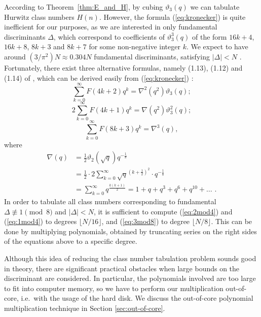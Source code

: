 \documentclass{mcom-l}
\theoremstyle{definition}
\begin{document}
According to Theorem~\ref{thm:E_and_H}, by cubing $\vartheta_3(q)$ we
can tabulate Hurwitz class numbers $H(n)$. However, the formula
(\ref{eq:kronecker}) is quite inefficient for our purposes, as we are
interested in only fundamental discriminants $\Delta$, which
correspond to coefficients of $\vartheta_3^3(q)$ of the form $16k +
4$, $16k + 8$, $8k + 3$ and $8k + 7$ for some non-negative integer
$k$.  We expect to have around $(3/\pi^2)N \approx 0.304 N$
fundamental discriminants, satisfying $|\Delta| < N$ \cite[Section
  5.10]{cohen3}. Fortunately, there exist three alternative formulas,
namely (1.13), (1.12) and (1.14) of \cite{watson}, which can be
derived easily from (\ref{eq:kronecker}) \cite{bell}:
\begin{equation}  \label{eq:2mod4}
\sum_{k = 0}^\infty F(4k+2)q^{k} = \nabla^2(q^2)\vartheta_3(q);
\end{equation}
\begin{equation}  \label{eq:1mod4}
2\sum_{k = 0}^\infty F(4k+1)q^k =  \nabla(q^2)\vartheta_3^2(q);
\end{equation}
\begin{equation} \label{eq:3mod8}
\sum_{k = 0}^\infty F(8k+3)q^{k} = \nabla^3(q),
\end{equation}
where
\begin{align*}
\nabla(q) &= \frac{1}{2}\vartheta_2(\sqrt q)q^{-\frac{1}{8}} \\
&= \frac{1}{2}\cdot 2\sum_{k = 0}^\infty {\sqrt q}^{\left(k +
  \frac{1}{2}\right)^2} \cdot q^{-\frac{1}{8}} \\
&= \sum_{k = 0}^\infty q^{\frac{k(k+1)}{2}} = 1 + q + q^3 + q^6 + q^{10} + \ldots \,\, .
\end{align*}
In order to tabulate all class numbers corresponding to fundamental
$\Delta \not \equiv 1 \pmod{8}$ and $|\Delta| < N$, it is sufficient
to compute (\ref{eq:2mod4}) and (\ref{eq:1mod4}) to degrees $\lfloor N
/ 16 \rfloor$, and (\ref{eq:3mod8}) to degree $\lfloor N / 8
\rfloor$. This can be done by multiplying polynomials, obtained by
truncating series on the right sides of the equations above to a
specific degree.

Although this idea of reducing the class number tabulation problem
sounds good in theory, there are significant practical obstacles when
large bounds on the discriminant are considered.  In particular, the
polynomials involved are too large to fit into computer memory, so we
have to perform our multiplication out-of-core, i.e.\ with the usage
of the hard disk. We discuss the out-of-core polynomial multiplication
technique in Section \ref{sec:out-of-core}.
\end{document}
